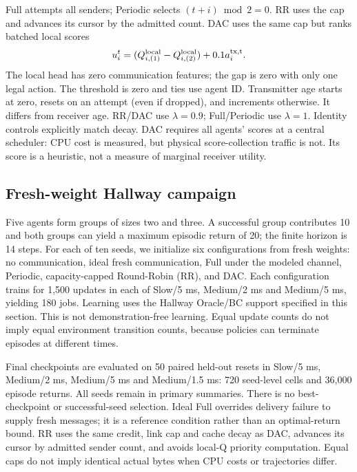 \documentclass[pdflatex,sn-mathphys-num]{sn-jnl}
\begin{document}
Full attempts all senders; Periodic selects $(t+i)\bmod2=0$. RR uses the cap and advances its cursor by the admitted count. DAC uses the same cap but ranks batched local scores
\begin{equation}
 u_i^t=(Q_{i,(1)}^{\rm local}-Q_{i,(2)}^{\rm local})+0.1a_i^{\rm tx,t}.
\end{equation}
The local head has zero communication features; the gap is zero with only one legal action. The threshold is zero and ties use agent ID. Transmitter age starts at zero, resets on an attempt (even if dropped), and increments otherwise. It differs from receiver age. RR/DAC use $\lambda=0.9$; Full/Periodic use $\lambda=1$. Identity controls explicitly match decay. DAC requires all agents' scores at a central scheduler: CPU cost is measured, but physical score-collection traffic is not. Its score is a heuristic, not a measure of marginal receiver utility.
\subsection{Fresh-weight Hallway campaign}
Five agents form groups of sizes two and three. A successful group contributes 10 and both groups can yield a maximum episodic return of 20; the finite horizon is 14 steps. For each of ten seeds, we initialize six configurations from fresh weights: no communication, ideal fresh communication, Full under the modeled channel, Periodic, capacity-capped Round-Robin (RR), and DAC. Each configuration trains for 1,500 updates in each of Slow/5 ms, Medium/2 ms and Medium/5 ms, yielding 180 jobs. Learning uses the Hallway Oracle/BC support specified in this section. This is not demonstration-free learning. Equal update counts do not imply equal environment transition counts, because policies can terminate episodes at different times.

Final checkpoints are evaluated on 50 paired held-out resets in Slow/5 ms, Medium/2 ms, Medium/5 ms and Medium/1.5 ms: 720 seed-level cells and 36,000 episode returns. All seeds remain in primary summaries. There is no best-checkpoint or successful-seed selection. Ideal Full overrides delivery failure to supply fresh messages; it is a reference condition rather than an optimal-return bound. RR uses the same credit, link cap and cache decay as DAC, advances its cursor by admitted sender count, and avoids local-Q priority computation. Equal caps do not imply identical actual bytes when CPU costs or trajectories differ.
\end{document}
